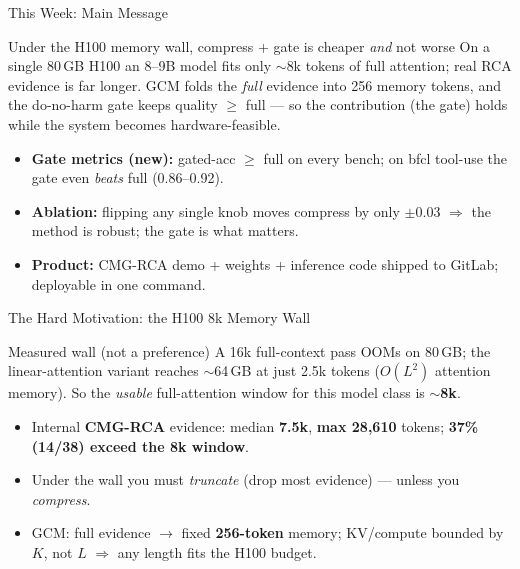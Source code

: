 \begin{frame}{This Week: Main Message}
  \begin{block}{Under the H100 memory wall, compress + gate is cheaper \emph{and} not worse}
    On a single 80\,GB H100 an 8--9B model fits only $\sim$8k tokens of full attention; real RCA evidence is far
    longer. GCM folds the \emph{full} evidence into 256 memory tokens, and the do-no-harm gate keeps quality
    $\ge$ full --- so the contribution (the gate) holds while the system becomes hardware-feasible.
  \end{block}
  \begin{itemize}
    \item \textbf{Gate metrics (new):} gated-acc $\ge$ full on every bench; on bfcl tool-use the gate even \emph{beats} full (0.86--0.92).
    \item \textbf{Ablation:} flipping any single knob moves compress by only $\pm$0.03 $\Rightarrow$ the method is robust; the gate is what matters.
    \item \textbf{Product:} CMG-RCA demo + weights + inference code shipped to GitLab; deployable in one command.
  \end{itemize}
\end{frame}

\begin{frame}{The Hard Motivation: the H100 8k Memory Wall}
  \small
  \begin{block}{Measured wall (not a preference)}
    A 16k full-context pass OOMs on 80\,GB; the linear-attention variant reaches $\sim$64\,GB at just 2.5k tokens
    ($O(L^2)$ attention memory). So the \emph{usable} full-attention window for this model class is $\sim$\textbf{8k}.
  \end{block}
  \begin{itemize}
    \item Internal \textbf{CMG-RCA} evidence: median \textbf{7.5k}, \textbf{max 28{,}610} tokens; \textbf{37\% (14/38) exceed the 8k window}.
    \item Under the wall you must \emph{truncate} (drop most evidence) --- unless you \emph{compress}.
    \item GCM: full evidence $\to$ fixed \textbf{256-token} memory; KV/compute bounded by $K$, not $L$ $\Rightarrow$ any length fits the H100 budget.
  \end{itemize}
\end{frame}

